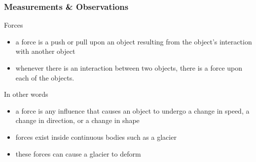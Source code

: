 \documentclass[hide notes,intlimits,unknownkeysallowed]{beamer}
\begin{document}
\begin{frame}
  \frametitle{Measurements \& Observations}
\end{frame}

\begin{frame}{Forces}
  \begin{itemize}
  \item a force is a push or pull upon an object resulting from the object's interaction with another object
  \item whenever there is an interaction between two objects, there is a force upon each of the objects. 
  \end{itemize}
  In other words
  \begin{itemize}
  \item a force is any influence that causes an object to undergo a change in speed, a change in direction, or a change in shape
  \item forces exist inside continuous bodies such as a glacier
  \item these forces can cause a glacier to deform
  \end{itemize}
\end{frame}
\end{document}
